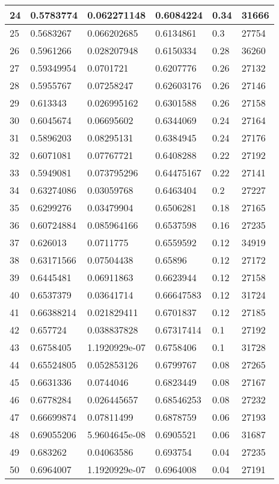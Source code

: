 \begin{longtable}{|l|l|l|l|l|l|}
24 & 0.5783774 & 0.062271148 & 0.6084224 & 0.34 & 31666 \\ \hline 
25 & 0.5683267 & 0.066202685 & 0.6134861 & 0.3 & 27754 \\ \hline 
26 & 0.5961266 & 0.028207948 & 0.6150334 & 0.28 & 36260 \\ \hline 
27 & 0.59349954 & 0.0701721 & 0.6207776 & 0.26 & 27132 \\ \hline 
28 & 0.5955767 & 0.07258247 & 0.62603176 & 0.26 & 27146 \\ \hline 
29 & 0.613343 & 0.026995162 & 0.6301588 & 0.26 & 27158 \\ \hline 
30 & 0.6045674 & 0.06695602 & 0.6344069 & 0.24 & 27164 \\ \hline 
31 & 0.5896203 & 0.08295131 & 0.6384945 & 0.24 & 27176 \\ \hline 
32 & 0.6071081 & 0.07767721 & 0.6408288 & 0.22 & 27192 \\ \hline 
33 & 0.5949081 & 0.073795296 & 0.64475167 & 0.22 & 27141 \\ \hline 
34 & 0.63274086 & 0.03059768 & 0.6463404 & 0.2 & 27227 \\ \hline 
35 & 0.6299276 & 0.03479904 & 0.6506281 & 0.18 & 27165 \\ \hline 
36 & 0.60724884 & 0.085964166 & 0.6537598 & 0.16 & 27235 \\ \hline 
37 & 0.626013 & 0.0711775 & 0.6559592 & 0.12 & 34919 \\ \hline 
38 & 0.63171566 & 0.07504438 & 0.65896 & 0.12 & 27172 \\ \hline 
39 & 0.6445481 & 0.06911863 & 0.6623944 & 0.12 & 27158 \\ \hline 
40 & 0.6537379 & 0.03641714 & 0.66647583 & 0.12 & 31724 \\ \hline 
41 & 0.66388214 & 0.021829411 & 0.6701837 & 0.12 & 27185 \\ \hline 
42 & 0.657724 & 0.038837828 & 0.67317414 & 0.1 & 27192 \\ \hline 
43 & 0.6758405 & 1.1920929e-07 & 0.6758406 & 0.1 & 31728 \\ \hline 
44 & 0.65524805 & 0.052853126 & 0.6799767 & 0.08 & 27265 \\ \hline 
45 & 0.6631336 & 0.0744046 & 0.6823449 & 0.08 & 27167 \\ \hline 
46 & 0.6778284 & 0.026445657 & 0.68546253 & 0.08 & 27232 \\ \hline 
47 & 0.66699874 & 0.07811499 & 0.6878759 & 0.06 & 27193 \\ \hline 
48 & 0.69055206 & 5.9604645e-08 & 0.6905521 & 0.06 & 31687 \\ \hline 
49 & 0.683262 & 0.04063586 & 0.693754 & 0.04 & 27235 \\ \hline 
50 & 0.6964007 & 1.1920929e-07 & 0.6964008 & 0.04 & 27191 \\ \hline 
\end{longtable}